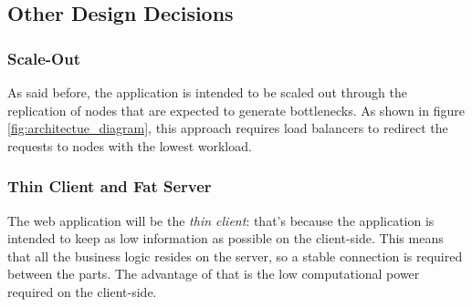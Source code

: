 \bigskip
\subsection{Other Design Decisions}
\subsubsection{Scale-Out}
As said before, the application is intended to be scaled out through the replication of nodes that are expected to generate bottlenecks. As shown in figure \ref{fig:architectue_diagram},
this approach requires load balancers to redirect the requests to nodes with the lowest workload.

\subsubsection{Thin Client and Fat Server}
The web application will be the \emph{thin client}: that's because the application is intended to keep as low information as possible on the client-side. This means that all the business
logic resides on the server, so a stable connection is required between the parts. The advantage of that is the low computational power required on the client-side.